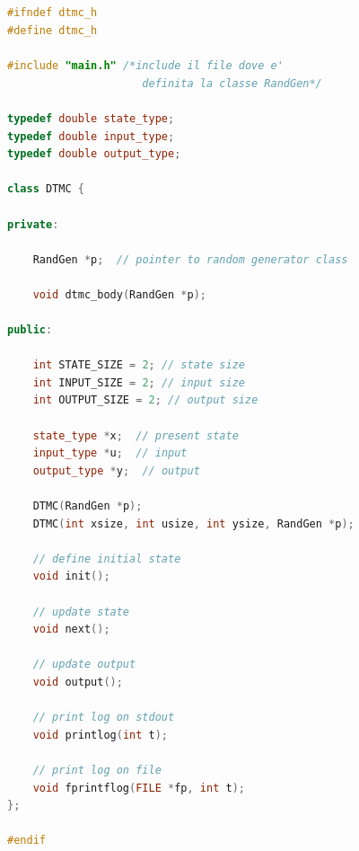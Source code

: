 \documentclass[10pt, letterpaper]{report}
\begin{document}
\newpage 
\subsection{}
\begin{lstlisting}[style=CppStyle,language=C++]
#ifndef dtmc_h
#define dtmc_h
    
#include "main.h" /*include il file dove e'
                     definita la classe RandGen*/
    
typedef double state_type;
typedef double input_type;
typedef double output_type;
    
class DTMC {
    
private:
    
    RandGen *p;  // pointer to random generator class
      
    void dtmc_body(RandGen *p);
    
public:
    
    int STATE_SIZE = 2; // state size
    int INPUT_SIZE = 2; // input size
    int OUTPUT_SIZE = 2; // output size
    
    state_type *x;  // present state
    input_type *u;  // input
    output_type *y;  // output
    
    DTMC(RandGen *p);
    DTMC(int xsize, int usize, int ysize, RandGen *p);
    
    // define initial state
    void init();
    
    // update state
    void next();
      
    // update output
    void output();
    
    // print log on stdout
    void printlog(int t);
    
    // print log on file
    void fprintflog(FILE *fp, int t);
};
    
#endif
\end{lstlisting}


\newpage 
\end{document}
